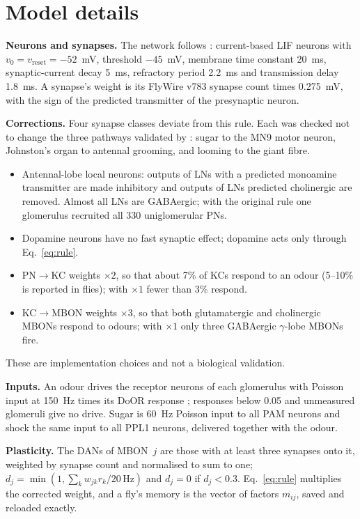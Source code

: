 \section{Model details}\label{app:model}
\textbf{Neurons and synapses.} The network follows \citet{shiu2024}: current-based LIF neurons with $v_0=v_{\mathrm{reset}}=-52$~mV, threshold $-45$~mV, membrane time constant 20~ms, synaptic-current decay 5~ms, refractory period 2.2~ms and transmission delay 1.8~ms. A synapse's weight is its FlyWire v783 synapse count times 0.275~mV, with the sign of the predicted transmitter of the presynaptic neuron.

\textbf{Corrections.} Four synapse classes deviate from this rule. Each was checked not to change the three pathways validated by \citet{shiu2024}: sugar to the MN9 motor neuron, Johnston's organ to antennal grooming, and looming to the giant fibre.
\begin{itemize}
\item Antennal-lobe local neurons: outputs of LNs with a predicted monoamine transmitter are made inhibitory and outputs of LNs predicted cholinergic are removed. Almost all LNs are GABAergic; with the original rule one glomerulus recruited all 330 uniglomerular PNs.
\item Dopamine neurons have no fast synaptic effect; dopamine acts only through Eq.~\ref{eq:rule}.
\item PN$\rightarrow$KC weights $\times2$, so that about 7\% of KCs respond to an odour (5--10\% is reported in flies); with $\times1$ fewer than 3\% respond.
\item KC$\rightarrow$MBON weights $\times3$, so that both glutamatergic and cholinergic MBONs respond to odours; with $\times1$ only three GABAergic $\gamma$-lobe MBONs fire.
\end{itemize}
These are implementation choices and not a biological validation.

\textbf{Inputs.} An odour drives the receptor neurons of each glomerulus with Poisson input at 150~Hz times its DoOR response \citep{munch2016}; responses below 0.05 and unmeasured glomeruli give no drive. Sugar is 60~Hz Poisson input to all PAM neurons and shock the same input to all PPL1 neurons, delivered together with the odour.

\textbf{Plasticity.} The DANs of MBON~$j$ are those with at least three synapses onto it, weighted by synapse count and normalised to sum to one; $d_j=\min(1,\sum_k w_{jk} r_k/20\,\mathrm{Hz})$ and $d_j=0$ if $d_j<0.3$. Eq.~\ref{eq:rule} multiplies the corrected weight, and a fly's memory is the vector of factors $m_{ij}$, saved and reloaded exactly.

